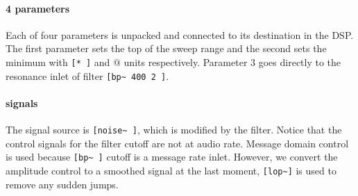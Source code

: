 \paragraph{4 parameters}
Each of four parameters is unpacked and connected to
its destination in the DSP. The first parameter
sets the top of the sweep range and the second
sets the minimum with  \verb+[* ]+ and \verb@[+ ]@
units respectively. Parameter 3 goes directly
to the resonance inlet of filter \verb+[bp~ 400 2 ]+.


\paragraph{signals}
The signal source is
\verb+[noise~ ]+, which is modified by the filter. Notice that
the control signals for the filter cutoff are not at audio rate.
Message domain control is used because \verb+[bp~ ]+ cutoff is a message rate inlet.
However, we convert the amplitude control to a smoothed signal at the last moment,
\verb+[lop~]+ is used to remove any sudden jumps. 
